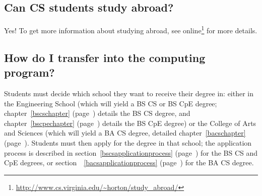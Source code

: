 \documentclass[10pt,letter,twocolumn]{book}
\newcommand{\myurl}[1]{\footnote{\scriptsize\url{#1}}}
\begin{document}

\subsection{Can CS students study abroad?}

Yes! To get more information about studying abroad, see
online\myurl{http://www.cs.virginia.edu/~horton/study_abroad/}
for more details.
 
\subsection{How do I transfer into the computing program?}

Students must decide which school they want to receive their degree
in: either in the Engineering School (which will yield a BS CS or BS
CpE degree; chapter~\ref{bscschapter} (page~\pageref{bscschapter})
details the BS CS degree, and chapter~\ref{bscpechapter}
(page~\pageref{bscpechapter}) details the BS CpE degree) or the
College of Arts and Sciences (which will yield a BA CS degree,
detailed chapter~\ref{bacschapter} (page~\pageref{bacschapter}).
Students must then apply for the degree in that school; the
application process is described in
section~\ref{bscsapplicationprocess}
(page~\pageref{bscsapplicationprocess}) for the BS CS and CpE degrees,
or section~~\ref{bacsapplicationprocess}
(page~\pageref{bacsapplicationprocess}) for the BA CS degree.

%
\end{document}
